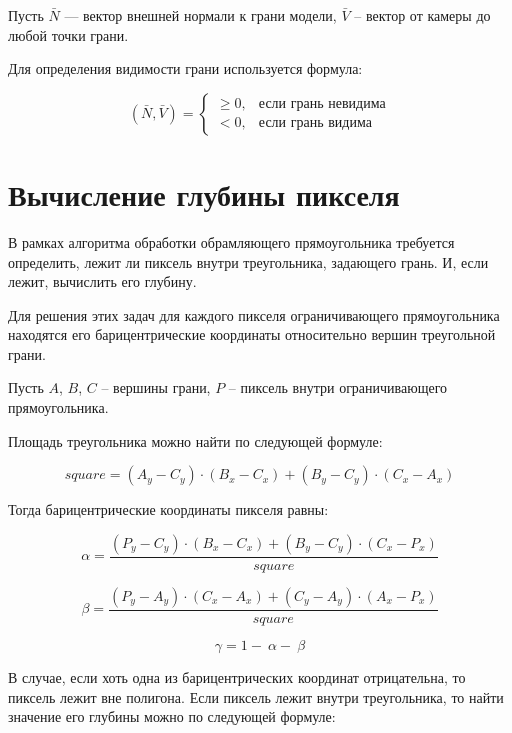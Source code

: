 Пусть
$\bar{N}$ --- вектор внешней нормали к грани модели,
$\bar{V}$ – вектор от камеры до любой точки грани.

Для определения видимости грани используется формула:

\begin{equation}
	(\bar{N},\bar{V})=
	\begin{cases}
		\geq 0, & \text{если грань невидима} \\
		< 0,   & \text{если грань видима}
	\end{cases}
\end{equation}

\section{Вычисление глубины пикселя}

В рамках алгоритма обработки обрамляющего прямоугольника требуется определить, лежит ли пиксель внутри треугольника, задающего грань. И, если лежит, вычислить его глубину.

Для решения этих задач для каждого пикселя ограничивающего прямоугольника находятся его барицентрические координаты относительно вершин треугольной грани.

Пусть $A$, $B$, $C$ – вершины грани, $P$ – пиксель внутри ограничивающего прямоугольника.

Площадь треугольника можно найти по следующей формуле:

\begin{equation}
	square=\left(A_y-C_y\right)\cdot\left(B_x-C_x\right)+\left(B_y-C_y\right)\cdot\left(C_x-A_x\right)
\end{equation}

Тогда барицентрические координаты пикселя равны:

\begin{equation}
	\alpha=\frac{\left(P_y-C_y\right)\cdot\left(B_x-C_x\right)+\left(B_y-C_y\right)\cdot\left(C_x-P_x\right)}{square}
\end{equation}	

\begin{equation}
	\beta=\frac{\left(P_y-A_y\right)\cdot\left(C_x-A_x\right)+\left(C_y-A_y\right)\cdot\left(A_x-P_x\right)}{square}
\end{equation}

\begin{equation}
	\gamma=1-\ \alpha-\ \beta
\end{equation}

В случае, если хоть одна из барицентрических координат отрицательна, то пиксель лежит вне полигона. Если пиксель лежит внутри треугольника, то найти значение его глубины можно по следующей формуле:

